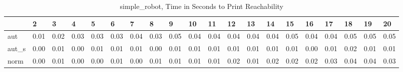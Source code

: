 \begin{table}
\centering
\caption{simple_robot, Time in Seconds to Print Reachability}
\label{simple_robot_states_time}
\begin{tabular}{llllllllllllllllllll}
\toprule
{} &     2 &     3 &     4 &     5 &     6 &     7 &     8 &     9 &    10 &    11 &    12 &    13 &    14 &    15 &    16 &    17 &    18 &    19 &    20 \\
\midrule
aut   &  0.01 &  0.02 &  0.03 &  0.03 &  0.03 &  0.04 &  0.03 &  0.05 &  0.04 &  0.04 &  0.04 &  0.04 &  0.04 &  0.05 &  0.04 &  0.04 &  0.05 &  0.05 &  0.05 \\
aut\_s &  0.00 &  0.01 &  0.00 &  0.01 &  0.01 &  0.01 &  0.00 &  0.01 &  0.01 &  0.01 &  0.01 &  0.01 &  0.01 &  0.01 &  0.00 &  0.01 &  0.02 &  0.01 &  0.01 \\
norm  &  0.00 &  0.01 &  0.00 &  0.00 &  0.01 &  0.00 &  0.01 &  0.01 &  0.01 &  0.01 &  0.02 &  0.01 &  0.02 &  0.02 &  0.02 &  0.03 &  0.04 &  0.04 &  0.03 \\
\bottomrule
\end{tabular}
\end{table}
